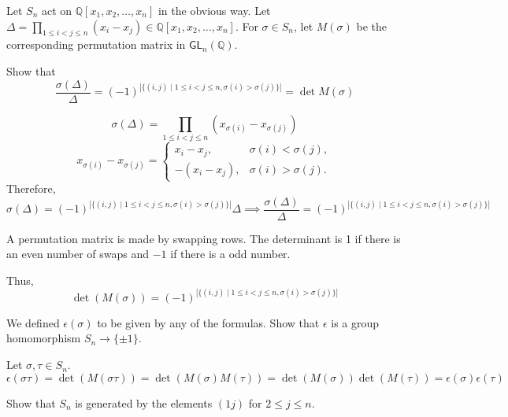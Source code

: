\documentclass[12pt, letterpaper]{article}
\newcommand{\Q}{\mathbb{Q}}
\begin{document}
\begin{problem}{}
    Let $S_n$ act on $\Q[x_1,x_2,\dots,x_n]$ in the obvious way. Let $\Delta = \prod_{1 \leq i < j \leq n}(x_i - x_j) \in \Q[x_1,x_2,\dots,x_n]$. For $\sigma \in S_n$, let $M(\sigma)$ be the corresponding permutation matrix in $\mathsf{GL}_n(\Q)$.
\end{problem}
\begin{subproblem}{}
    Show that
    \[\frac{\sigma(\Delta)}{\Delta}=(-1)^{\left\lvert \{(i,j) \mid 1 \leq i < j \leq n, \sigma(i) > \sigma(j)\} \right\rvert}=\det M(\sigma)\]
\end{subproblem}
\begin{problemproof}
    \[\sigma(\Delta)=\prod_{1 \leq i < j \leq n}(x_{\sigma(i)}-x_{\sigma(j)})\]
    \[
    x_{\sigma(i)}-x_{\sigma(j)} = \begin{cases}
        x_i-x_j, & \sigma(i) < \sigma(j),\\
        -(x_i-x_j), & \sigma(i)>\sigma(j).
    \end{cases}
    \]
    Therefore,
    \[\sigma(\Delta)=(-1)^{\left\lvert \{(i,j) \mid 1 \leq i < j \leq n, \sigma(i) > \sigma(j)\} \right\rvert}\Delta \implies \frac{\sigma(\Delta)}{\Delta}=(-1)^{\left\lvert \{(i,j) \mid 1 \leq i < j \leq n, \sigma(i) > \sigma(j)\} \right\rvert}\]

    A permutation matrix is made by swapping rows. The determinant is 1 if there is an even number of swaps and $-1$ if there is a odd number.

    Thus, \[\det(M(\sigma))=(-1)^{\left\lvert \{(i,j) \mid 1 \leq i < j \leq n, \sigma(i) > \sigma(j)\} \right\rvert}\]
\end{problemproof}
\begin{subproblem}{}
    We defined $\epsilon(\sigma)$ to be given by any of the formulas. Show that $\epsilon$ is a group homomorphism $S_n \to \{\pm 1\}$.
\end{subproblem}
\begin{problemproof}
    Let $\sigma,\tau \in S_n$.
    \[\epsilon(\sigma\tau)=\det (M(\sigma\tau))=\det(M(\sigma)M(\tau))=\det(M(\sigma))\det(M(\tau))=\epsilon(\sigma)\epsilon(\tau)\]
\end{problemproof}
\begin{subproblem}{}
    Show that $S_n$ is generated by the elements $(1j)$ for $2 \leq j \leq n$.
\end{subproblem}
\end{document}
